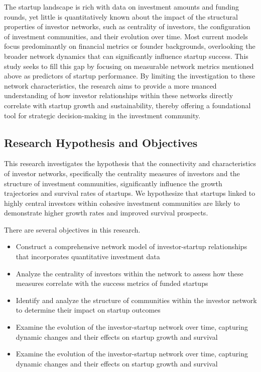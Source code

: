 \documentclass[a4paper,11pt]{article}
\begin{document}
The startup landscape is rich with data on investment amounts and funding rounds, yet little is quantitatively known about the impact of the structural properties of investor networks, such as centrality of investors, the configuration of investment communities, and their evolution over time. Most current models focus predominantly on financial metrics or founder backgrounds, overlooking the broader network dynamics that can significantly influence startup success. This study seeks to fill this gap by focusing on measurable network metrics mentioned above as predictors of startup performance. By limiting the investigation to these network characteristics, the research aims to provide a more nuanced understanding of how investor relationships within these networks directly correlate with startup growth and sustainability, thereby offering a foundational tool for strategic decision-making in the investment community.

\subsection{Research Hypothesis and Objectives}
This research investigates the hypothesis that the connectivity and characteristics of investor networks, specifically the centrality measures of investors and the structure of investment communities, significantly influence the growth trajectories and survival rates of startups. We hypothesize that startups linked to highly central investors within cohesive investment communities are likely to demonstrate higher growth rates and improved survival prospects.

There are several objectives in this research. 
\begin{itemize}
    \item Construct a comprehensive network model of investor-startup relationships that incorporates quantitative investment data
    \item Analyze the centrality of investors within the network to assess how these measures correlate with the success metrics of funded startups
    \item Identify and analyze the structure of communities within the investor network to determine their impact on startup outcomes
    \item Examine the evolution of the investor-startup network over time, capturing dynamic changes and their effects on startup growth and survival
    \item Examine the evolution of the investor-startup network over time, capturing dynamic changes and their effects on startup growth and survival
\end{itemize}
\end{document}
